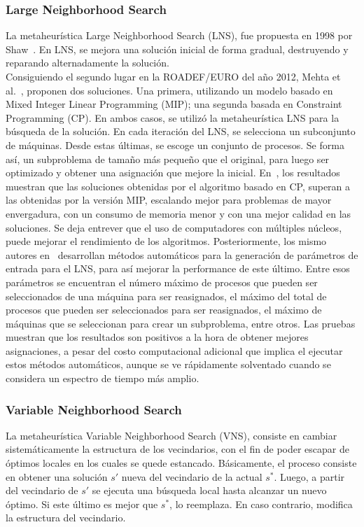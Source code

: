 \documentclass[../informe2.tex]{subfiles}
\begin{document}
\subsubsection{Large Neighborhood Search}
La metaheurística Large Neighborhood Search (LNS), fue propuesta en 1998 por Shaw~\cite{shaw1998using}. En LNS, se mejora una solución inicial de forma gradual, destruyendo y reparando alternadamente la solución.\\
Consiguiendo el segundo lugar en la ROADEF/EURO del año 2012, Mehta et al.~\cite{mehta2012comparing}, proponen dos soluciones. Una primera, utilizando un modelo basado en Mixed Integer Linear Programming (MIP); una segunda basada en Constraint Programming (CP). En ambos casos, se utilizó la metaheurística LNS para la búsqueda de la solución. En cada iteración del LNS, se selecciona un subconjunto de máquinas. Desde estas últimas, se escoge un conjunto de procesos. Se forma así, un subproblema de tamaño más pequeño que el original, para luego ser optimizado y obtener una asignación que mejore la inicial.
En~\cite{mehta2012comparing}, los resultados muestran que las soluciones obtenidas por el algoritmo basado en CP, superan a las obtenidas por la versión MIP, escalando mejor para problemas de mayor envergadura, con un consumo de memoria menor y con una mejor calidad en las soluciones. Se deja entrever que el uso de computadores con múltiples núcleos, puede mejorar el rendimiento de los algoritmos. Posteriormente, los mismo autores en~\cite{malitsky2013tuning} desarrollan métodos automáticos para la generación de parámetros de entrada para el LNS, para así mejorar la performance de este último. Entre esos parámetros se encuentran el número máximo de procesos que pueden ser seleccionados de una máquina para ser reasignados, el máximo del total de procesos que pueden ser seleccionados para ser reasignados, el máximo de máquinas que se seleccionan para crear un subproblema, entre otros. Las pruebas muestran que los resultados son positivos a la hora de obtener mejores asignaciones, a pesar del costo computacional adicional que implica el ejecutar estos métodos automáticos, aunque se ve rápidamente solventado cuando se considera un espectro de tiempo más amplio. \\

\subsubsection{Variable Neighborhood Search}
La metaheurística Variable Neighborhood Search (VNS), consiste en cambiar sistemáticamente la estructura de los vecindarios, con el fin de poder escapar de óptimos locales en los cuales se quede estancado. Básicamente, el proceso consiste en obtener una solución $s'$ nueva del vecindario de la actual $s^{*}$. Luego, a partir del vecindario de $s'$ se ejecuta una búsqueda local hasta alcanzar un nuevo óptimo. Si este último es mejor que $s^{*}$, lo reemplaza. En caso contrario, modifica la estructura del vecindario. \\
\end{document}
